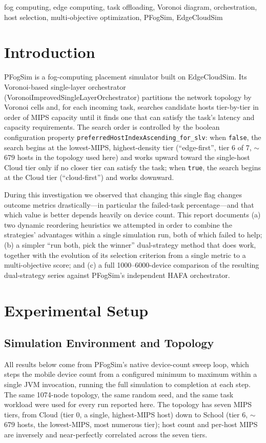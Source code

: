\documentclass[10pt,conference]{IEEEtran}
\begin{document}
\begin{IEEEkeywords}
fog computing, edge computing, task offloading, Voronoi diagram, orchestration, host selection, multi-objective optimization, PFogSim, EdgeCloudSim
\end{IEEEkeywords}

\section{Introduction}\label{sec:intro}
PFogSim is a fog-computing placement simulator built on EdgeCloudSim. Its Voronoi-based single-layer orchestrator (VoronoiImprovedSingleLayerOrchestrator) partitions the network topology by Voronoi cells and, for each incoming task, searches candidate hosts tier-by-tier in order of MIPS capacity until it finds one that can satisfy the task's latency and capacity requirements. The search order is controlled by the boolean configuration property \texttt{preferredHostIndexAscending\_for\_slv}: when \texttt{false}, the search begins at the lowest-MIPS, highest-density tier (``edge-first'', tier 6 of 7, $\sim$679 hosts in the topology used here) and works upward toward the single-host Cloud tier only if no closer tier can satisfy the task; when \texttt{true}, the search begins at the Cloud tier (``cloud-first'') and works downward.

During this investigation we observed that changing this single flag changes outcome metrics drastically---in particular the failed-task percentage---and that which value is better depends heavily on device count. This report documents (a) two dynamic reordering heuristics we attempted in order to combine the strategies' advantages within a single simulation run, both of which failed to help; (b) a simpler ``run both, pick the winner'' dual-strategy method that does work, together with the evolution of its selection criterion from a single metric to a multi-objective score; and (c) a full 1000--6000-device comparison of the resulting dual-strategy series against PFogSim's independent HAFA orchestrator.

\section{Experimental Setup}\label{sec:setup}
\subsection{Simulation Environment and Topology}\label{sub:topology}
All results below come from PFogSim's native device-count sweep loop, which steps the mobile device count from a configured minimum to maximum within a single JVM invocation, running the full simulation to completion at each step. The same 1074-node topology, the same random seed, and the same task workload were used for every run reported here. The topology has seven MIPS tiers, from Cloud (tier 0, a single, highest-MIPS host) down to School (tier 6, $\sim$679 hosts, the lowest-MIPS, most numerous tier); host count and per-host MIPS are inversely and near-perfectly correlated across the seven tiers.
\end{document}
